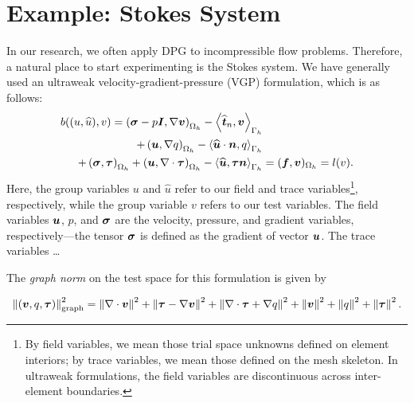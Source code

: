\documentclass[11pt]{amsart}
\begin{document}
\section{Example: Stokes System}
In our research, we often apply DPG to incompressible flow problems.  Therefore, a natural place to start experimenting is the Stokes system.  We have generally used an ultraweak velocity-gradient-pressure (VGP) formulation, which is as follows:
\begin{align*}
b((u,\widehat{u}),v) = \left(\boldsymbol{\sigma} - p \boldsymbol{I}, \nabla \boldsymbol{v} \right)_{\Omega_{h}} - \left\langle \widehat{\boldsymbol{t}}_{n}, \boldsymbol{v} \right\rangle_{\Gamma_{h}} &\notag\\
+\left(\boldsymbol{u}, \nabla q \right)_{\Omega_{h}} -  \left\langle \widehat{\boldsymbol{u}} \cdot \boldsymbol{n}, q  \right\rangle_{\Gamma_{h}} &\label{NVR:eqn:variationalForm}\\
+ \left( \boldsymbol{\sigma}, \boldsymbol{\tau} \right)_{\Omega_{h}} + \left( \boldsymbol{u}, \nabla \cdot \boldsymbol{\tau} \right)_{\Omega_{h}} - \left\langle \widehat{\boldsymbol{u}}, \boldsymbol{\tau} \boldsymbol{n}  \right\rangle_{\Gamma_{h}} &= (\boldsymbol{f}, \boldsymbol{v} )_{\Omega_{h}} = l(v).\notag
\end{align*}
Here, the group variables $u$ and $\widehat{u}$ refer to our field and trace variables\footnote{By field variables, we mean those trial space unknowns defined on element interiors; by trace variables, we mean those defined on the mesh skeleton.  In ultraweak formulations, the field variables are discontinuous across inter-element boundaries.}, respectively, while the group variable $v$ refers to our test variables.  The field variables $\boldsymbol{u}$, $p$, and $\boldsymbol{\sigma}$ are the velocity, pressure, and gradient variables, respectively---the tensor $\boldsymbol{\sigma}$ is defined as the gradient of vector $\boldsymbol{u}$.  The trace variables \dots

The \emph{graph norm} on the test space for this formulation is given by

\begin{align*}
\left\Vert (\boldsymbol{v},q,\boldsymbol{\tau}) \right\Vert_{\rm graph}^{2} = \left\Vert \nabla \cdot \boldsymbol{v} \right\Vert^{2} + \left\Vert  \boldsymbol{\tau} - \nabla{\ensuremath\boldsymbol{v}} \right\Vert^{2} + \left\Vert \nabla \cdot \boldsymbol{\tau} + \nabla q \right\Vert^{2} + \left\Vert \boldsymbol{v} \right\Vert^{2} + \left\Vert q \right\Vert^{2} + \left\Vert \boldsymbol{\tau} \right\Vert^{2}.
\end{align*}
\end{document}
